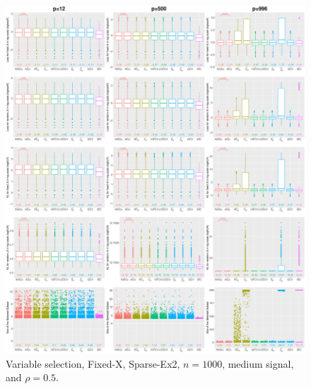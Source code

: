 \begin{figure}[!ht]
\centering
\includegraphics[width=\textwidth]{figures/supplement/fixedx/subset_selection/Sparse-Ex2_n1000_msnr_rho05.eps}
\caption{Variable selection, Fixed-X, Sparse-Ex2, $n=1000$, medium signal, and $\rho=0.5$.}
\end{figure}
\clearpage
